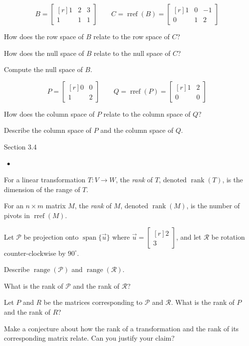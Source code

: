 \documentclass{problemset}
\DeclareMathOperator{\Span}{span}
\DeclareMathOperator{\Range}{range}
\DeclareMathOperator{\Rref}{rref}
\DeclareMathOperator{\Rank}{rank}
\newcommand{\rref}{\Rref}
\newcommand{\mat}[1]{\begin{bmatrix*}[r]#1\end{bmatrix*}}
\begin{document}
	\question
	\[
		B=\mat{1&2&3\\1&1&1}\qquad C=\rref(B)=\mat{1&0&-1\\0&1&2}
	\]
	\begin{parts}
		\item How does the row space of $B$ relate to the row space of $C$?
		\item How does the null space of $B$ relate to the null space of $C$?
		\item Compute the null space of $B$.
	\end{parts}

	\question
	\[
		P=\mat{0&0\\1&2}\qquad Q=\rref(P)=\mat{1&2\\0&0}
	\]
	\begin{parts}
		\item How does the column space of $P$ relate to the column space of $Q$?
		\item Describe the column space of $P$ and the column space of $Q$.
	\end{parts}


\begin{lesson}
	\newpage

	Section 3.4

	\begin{itemize}
		\item 
	\end{itemize}


	\newpage
\end{lesson}
	\newpage
	\begin{definition}[Rank]
		For a linear transformation $T:V\to W$, the \emph{rank} of $T$,
		denoted $\Rank(T)$, is the dimension of the range of $T$.

		For an $n\times m$ matrix $M$, the \emph{rank} of $M$, denoted
		$\Rank(M)$, is the number of pivots in $\rref(M)$.
	\end{definition}

	\question
	Let $\mathcal P$ be projection onto $\Span\{\vec u\}$ where $\vec u=\mat{2\\3}$,
	and let $\mathcal R$ be rotation counter-clockwise by $90^\circ$.
	\begin{parts}
		\item Describe $\Range(\mathcal P)$ and $\Range(\mathcal R)$.
		\item What is the rank of $\mathcal P$ and the rank of $\mathcal R$?
		\item Let $P$ and $R$ be the matrices corresponding to $\mathcal P$ and
			$\mathcal R$. What is the rank of $P$ and the rank of $R$?
		\item Make a conjecture about how the rank of a transformation and
			the rank of its corresponding matrix relate. Can you justify your claim?
	\end{parts}
\end{document}
